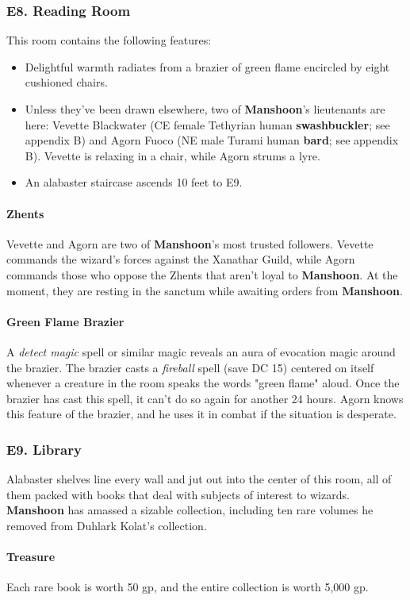 \documentclass[10pt,a4paper,twoside,twocolumn,openany,nodeprecatedcode]{dndbook}
\begin{document}
\subsubsection{E8. Reading Room}
This room contains the following features:
\begin{itemize}

\item Delightful warmth radiates from a brazier of green flame encircled by eight cushioned chairs.
\item Unless they've been drawn elsewhere, two of \textbf{Manshoon}'s lieutenants are here: Vevette Blackwater (CE female Tethyrian human \textbf{swashbuckler}; see appendix B) and Agorn Fuoco (NE male Turami human \textbf{bard}; see appendix B). Vevette is relaxing in a chair, while Agorn strums a lyre.
\item An alabaster staircase ascends 10 feet to E9.
\end{itemize}


\paragraph{Zhents}
Vevette and Agorn are two of \textbf{Manshoon}'s most trusted followers. Vevette commands the wizard's forces against the Xanathar Guild, while Agorn commands those who oppose the Zhents that aren't loyal to \textbf{Manshoon}. At the moment, they are resting in the sanctum while awaiting orders from \textbf{Manshoon}.
\paragraph{Green Flame Brazier}
A \textit{detect magic} spell or similar magic reveals an aura of evocation magic around the brazier. The brazier casts a \textit{fireball} spell (save DC 15) centered on itself whenever a creature in the room speaks the words "green flame" aloud. Once the brazier has cast this spell, it can't do so again for another 24 hours. Agorn knows this feature of the brazier, and he uses it in combat if the situation is desperate.
\subsubsection{E9. Library}
Alabaster shelves line every wall and jut out into the center of this room, all of them packed with books that deal with subjects of interest to wizards. \textbf{Manshoon} has amassed a sizable collection, including ten rare volumes he removed from Duhlark Kolat's collection.
\paragraph{Treasure}
Each rare book is worth 50 gp, and the entire collection is worth 5,000 gp.
\end{document}
